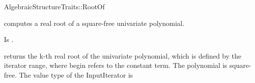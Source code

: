 \begin{ccRefFunctionObjectConcept}{AlgebraicStructureTraits::RootOf}

\ccDefinition

 computes a real root of a square-free univariate
polynomial.

\ccRefines


\ccTypes
{} 
        { Is .}

\ccOperations
{}

        {returns the k-th real root of the univariate polynomial,
        which is defined by the iterator range,
        where begin refers to the constant term.
        \ccPrecond The polynomial is square-free.
        \ccPrecond The value type of the InputIterator is \\ }



\ccSeeAlso

\\

\end{ccRefFunctionObjectConcept}
